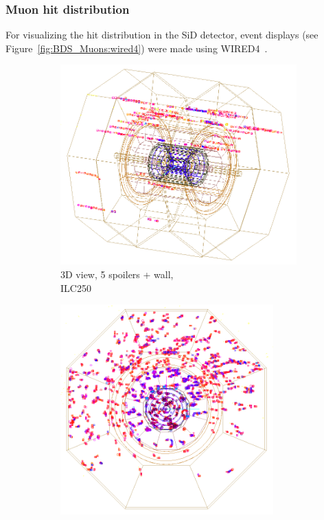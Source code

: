 \subsubsection{Muon hit distribution}
For visualizing the hit distribution in the SiD detector, event displays (see Figure~\ref{fig:BDS_Muons:wired4}) were made using WIRED4~\cite{Wired4}.
 \begin{figure}[htbp]
 \centering
  \begin{subfigure}[b]{0.31\textwidth}
   \centering
   \includegraphics[width=\textwidth]{Figures/BDS_muons/Event_display_ILC250_p_spoilers_wall_inverted.png}
   \caption{3D view, 5 spoilers + wall,\\ILC250}
   \end{subfigure}
   \hfill
   \begin{subfigure}[b]{0.31\textwidth}
   \centering
    \includegraphics[width=0.9\textwidth]{Figures/BDS_muons/muons_positron_5spoilers_wall_515_xyview_croped_inverted.png}

\end{subfigure}
\end{figure}
